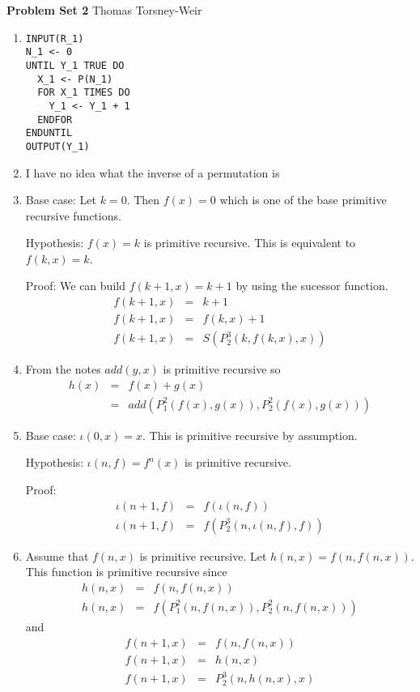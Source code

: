 \documentclass[10pt]{article}
\begin{document}
{\bf Problem Set 2} \hfill {\raggedleft Thomas Torsney-Weir}

\begin{enumerate}
\item %
  \begin{verbatim}
INPUT(R_1)
N_1 <- 0
UNTIL Y_1 TRUE DO
  X_1 <- P(N_1)
  FOR X_1 TIMES DO
    Y_1 <- Y_1 + 1
  ENDFOR
ENDUNTIL
OUTPUT(Y_1)
  \end{verbatim}

\item 
  I have no idea what the inverse of a permutation is

\item %
  Base case: Let $k=0$. Then $f(x) = 0$ which is one of the base primitive 
  recursive functions.

  Hypothesis: $f(x) = k$ is primitive recursive.  This is equivalent 
              to $f(k, x) = k$.

  Proof:  We can build $f(k+1,x) = k+1$ by using the sucessor function.
  \begin{eqnarray*}
    f(k+1, x) & = & k + 1 \\
    f(k+1, x) & = & f(k, x) + 1 \\
    f(k+1, x) & = & S(P_2^3(k, f(k, x), x)) 
  \end{eqnarray*}

\item %
  From the notes $add(y, x)$ is primitive recursive so
  \begin{eqnarray*}
    h(x) & = & f(x) + g(x) \\
         & = & add(P_1^2(f(x), g(x)), P_2^2(f(x), g(x)))
  \end{eqnarray*}

\item %
  Base case: $\iota(0, x) = x$.  This is primitive recursive by assumption.
  
  Hypothesis: $\iota(n, f) = f^n(x)$ is primitive recursive.

  Proof: 
  \begin{eqnarray*}
    \iota(n+1, f) & = & f(\iota(n, f)) \\
    \iota(n+1, f) & = & f(P_2^3(n, \iota(n, f), f))
  \end{eqnarray*}

\item %
  Assume that $f(n, x)$ is primitive recursive.  Let $h(n, x) = f(n, f(n, x))$.
  This function is primitive recursive since
  \begin{eqnarray*}
    h(n, x) & = & f(n, f(n, x)) \\
    h(n, x) & = & f(P_1^2(n, f(n, x)), P_2^2(n, f(n, x)))
  \end{eqnarray*}
  and
  \begin{eqnarray*}
    f(n+1, x) & = & f(n, f(n, x)) \\
    f(n+1, x) & = & h(n, x) \\
    f(n+1, x) & = & P_2^3(n, h(n, x), x)
  \end{eqnarray*}


\end{enumerate}
\end{document}

